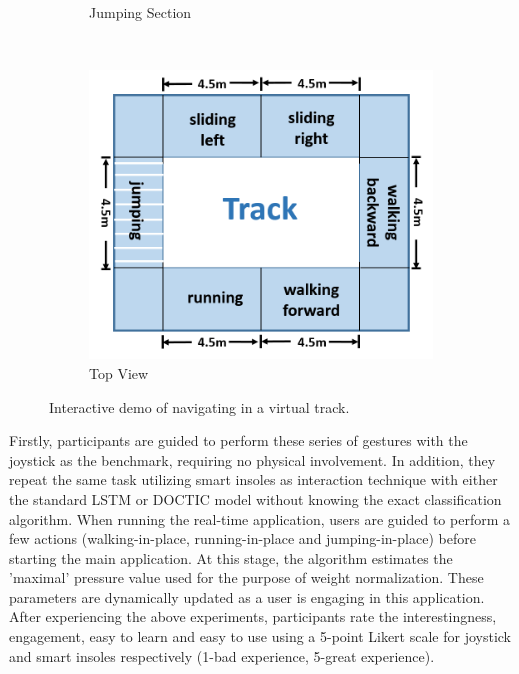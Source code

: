 \documentclass[review]{vgtc}                 %
\begin{document}
\begin{figure}[!htpb]
\begin{subfigure}{0.45\linewidth}
		\caption[]{\label{fig:track_close} Jumping Section
		}
	\end{subfigure}
	~
	\\
	\begin{subfigure}{\linewidth}
		\centering	
		\includegraphics[width=\linewidth]{./figs/track_layout.png}
		\caption[]{\label{fig:track_layout} Top View
		}
	\end{subfigure}			
	\caption[]{\label{fig:track}
		Interactive demo of navigating in a virtual track.
	}
\end{figure}

Firstly, participants are guided to perform these series of gestures with the joystick as the benchmark, requiring no physical involvement. In addition, they repeat the same task utilizing smart insoles as interaction technique with either the standard LSTM or DOCTIC model  without knowing the exact classification algorithm.
When running the real-time application, users are guided to perform a few actions (walking-in-place, running-in-place and jumping-in-place) before starting the main application.
At this stage, the algorithm estimates the 'maximal' pressure value used for the purpose of weight normalization.
These parameters are dynamically updated as a user is engaging in this application.
After experiencing the above experiments, participants rate the interestingness, engagement, easy to learn and easy to use using a 5-point Likert scale for joystick and smart insoles respectively (1-bad experience, 5-great experience).
\end{document}
